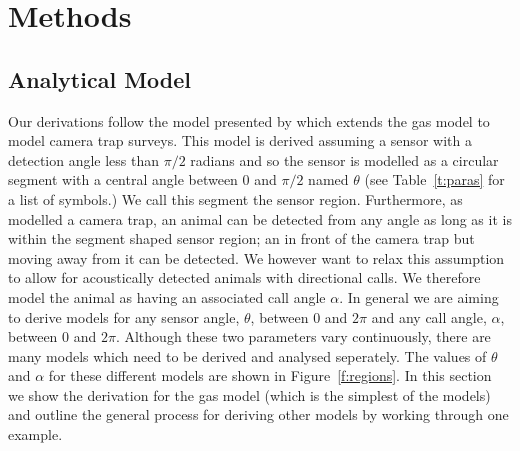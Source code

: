 \documentclass[a4paper,10pt,reqno,oneside]{amsart}
\begin{document}

\section{Methods}

\subsection{Analytical Model}

Our derivations follow the model presented by \cite{rowcliffe2008estimating} which extends the gas model to model camera trap surveys. This model is derived assuming a sensor with a detection angle less than $\pi/2$ radians and so the sensor is modelled as a circular segment with a central angle between 0 and  $\pi/2$ named  $\theta$ (see Table~\ref{t:paras} for a list of symbols.) We call this segment the sensor region. Furthermore, as \cite{rowcliffe2008estimating}  modelled a camera trap, an animal can be detected from any angle as long as it is within the segment shaped sensor region; an in front of the camera trap but moving away from it can be detected. We however want to relax this assumption to allow for acoustically detected animals with directional calls. We therefore model the animal as having an associated call angle $\alpha$. In general we are aiming to derive models for any sensor angle, $ \theta$, between 0 and $2\pi$ and any call angle, $ \alpha$, between 0 and $2\pi$. Although these two parameters vary continuously, there are many models which need to be derived and analysed seperately. The values of $\theta$ and $\alpha$ for these different models are shown in Figure~\ref{f:regions}. In this section we show the derivation for the gas model (which is the simplest of the models) and outline the general process for deriving other models by working through one example. 
\end{document}
